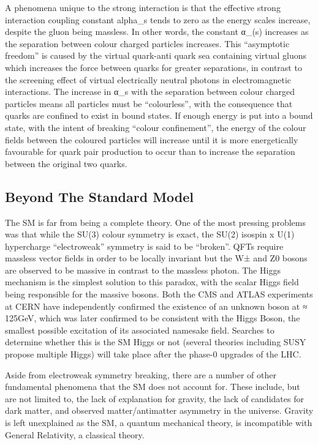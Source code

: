 A phenomena unique to the strong interaction is that the effective strong interaction coupling constant alpha_s tends to zero as the energy scales increase, despite the gluon being massless. 
In other words, the constant α_(s) increases as the separation between colour charged particles increases. 
This “asymptotic freedom” is caused by the virtual quark-anti quark sea containing virtual gluons which increases the force between quarks for greater separations, in contrast to the screening effect of virtual electrically neutral photons in electromagnetic interactions. 
The increase in α_s with the separation between colour charged particles means all particles must be “colourless”, with the consequence that quarks are confined to exist in bound states. 
If enough energy is put into a bound state, with the intent of breaking “colour confinement”, the energy of the colour fields between the coloured particles will increase until it is more energetically favourable for quark pair production to occur than to increase the separation between the original two quarks. 

\subsection{Beyond The Standard Model}\label{bsm}

The SM is far from being a complete theory. 
One of the most pressing problems was that while the SU(3) colour symmetry is exact, the SU(2) isospin x U(1) hypercharge “electroweak” symmetry is said to be “broken”. 
QFTs require massless vector fields in order to be locally invariant but the W± and Z0 bosons are observed to be massive in contrast to the massless photon. 
The Higgs mechanism is the simplest solution to this paradox, with the scalar Higgs field being responsible for the massive bosons. 
Both the CMS and ATLAS experiments at CERN have independently confirmed the existence of an unknown boson at ≈ 125GeV, which was later confirmed to be consistent with the Higgs Boson, the smallest possible excitation of its associated namesake field. 
Searches to determine whether this is the SM Higgs or not (several theories including SUSY propose multiple Higgs) will take place after the phase-0 upgrades of the LHC. 

Aside from electroweak symmetry breaking, there are a number of other fundamental phenomena that the SM does not account for. 
These include, but are not limited to, the lack of explanation for gravity, the lack of candidates for dark matter, and observed matter/antimatter asymmetry in the universe. 
Gravity is left unexplained as the SM, a quantum mechanical theory, is incompatible with General Relativity, a classical theory. 

